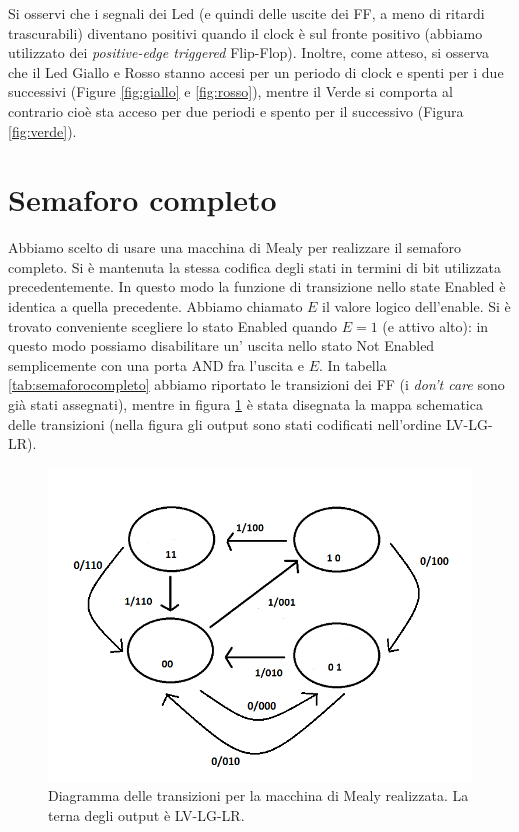 \documentclass[10pt,a4paper]{article}
\begin{document}
Si osservi che i segnali dei Led (e quindi delle uscite dei FF, a meno di ritardi trascurabili) diventano positivi quando il clock è sul fronte positivo (abbiamo utilizzato dei \emph{positive-edge triggered} Flip-Flop). Inoltre, come atteso, si osserva che il Led Giallo e Rosso stanno accesi per un periodo di clock e spenti per i due successivi (Figure \ref{fig:giallo} e \ref{fig:rosso}), mentre il Verde si comporta al contrario cioè sta acceso per due periodi e spento per il successivo (Figura \ref{fig:verde}).


\section{Semaforo completo}
Abbiamo scelto di usare una macchina di Mealy per realizzare il semaforo completo. Si è mantenuta la stessa codifica degli stati in termini di bit utilizzata precedentemente. In questo modo la funzione di transizione nello state Enabled è identica a quella precedente. Abbiamo chiamato $E$ il valore logico dell'enable.
Si è trovato conveniente scegliere lo stato Enabled quando $E = 1$ (e attivo alto): in questo modo possiamo disabilitare un' uscita nello stato Not Enabled semplicemente con una porta AND fra l'uscita e $E$. In tabella \ref{tab:semaforocompleto} abbiamo riportato le transizioni dei FF (i \emph{don't care} sono già stati assegnati), mentre in figura \ref{fig:FSMcomplete} è stata disegnata la mappa schematica delle transizioni (nella figura gli output sono stati codificati nell'ordine LV-LG-LR).

\begin{figure}[!htb]
\centering
\includegraphics[scale=0.7]{FSMcomplete.png}
\caption{Diagramma delle transizioni per la macchina di Mealy realizzata. La terna degli output è LV-LG-LR.\label{fig:FSMcomplete}}
\end{figure}
\end{document}
